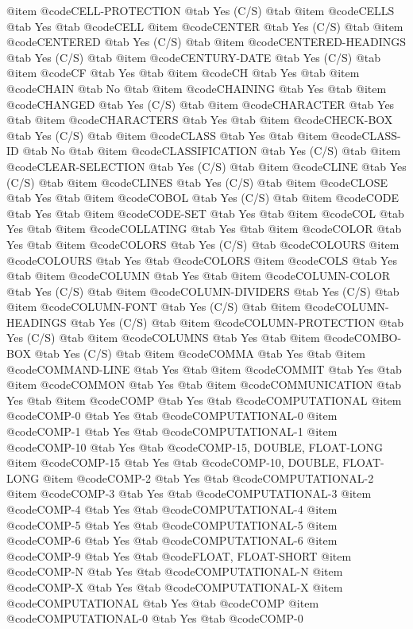 @item @code{CELL-PROTECTION} @tab Yes	(C/S) @tab 
@item @code{CELLS} @tab Yes @tab @code{CELL}
@item @code{CENTER} @tab Yes	(C/S) @tab 
@item @code{CENTERED} @tab Yes	(C/S) @tab 
@item @code{CENTERED-HEADINGS} @tab Yes	(C/S) @tab 
@item @code{CENTURY-DATE} @tab Yes	(C/S) @tab 
@item @code{CF} @tab Yes @tab 
@item @code{CH} @tab Yes @tab 
@item @code{CHAIN} @tab No @tab 
@item @code{CHAINING} @tab Yes @tab 
@item @code{CHANGED} @tab Yes	(C/S) @tab 
@item @code{CHARACTER} @tab Yes @tab 
@item @code{CHARACTERS} @tab Yes @tab 
@item @code{CHECK-BOX} @tab Yes	(C/S) @tab 
@item @code{CLASS} @tab Yes @tab 
@item @code{CLASS-ID} @tab No @tab 
@item @code{CLASSIFICATION} @tab Yes	(C/S) @tab 
@item @code{CLEAR-SELECTION} @tab Yes	(C/S) @tab 
@item @code{CLINE} @tab Yes	(C/S) @tab 
@item @code{CLINES} @tab Yes	(C/S) @tab 
@item @code{CLOSE} @tab Yes @tab 
@item @code{COBOL} @tab Yes	(C/S) @tab 
@item @code{CODE} @tab Yes @tab 
@item @code{CODE-SET} @tab Yes @tab 
@item @code{COL} @tab Yes @tab 
@item @code{COLLATING} @tab Yes @tab 
@item @code{COLOR} @tab Yes @tab 
@item @code{COLORS} @tab Yes	(C/S) @tab @code{COLOURS}
@item @code{COLOURS} @tab Yes @tab @code{COLORS}
@item @code{COLS} @tab Yes @tab 
@item @code{COLUMN} @tab Yes @tab 
@item @code{COLUMN-COLOR} @tab Yes	(C/S) @tab 
@item @code{COLUMN-DIVIDERS} @tab Yes	(C/S) @tab 
@item @code{COLUMN-FONT} @tab Yes	(C/S) @tab 
@item @code{COLUMN-HEADINGS} @tab Yes	(C/S) @tab 
@item @code{COLUMN-PROTECTION} @tab Yes	(C/S) @tab 
@item @code{COLUMNS} @tab Yes @tab 
@item @code{COMBO-BOX} @tab Yes	(C/S) @tab 
@item @code{COMMA} @tab Yes @tab 
@item @code{COMMAND-LINE} @tab Yes @tab 
@item @code{COMMIT} @tab Yes @tab 
@item @code{COMMON} @tab Yes @tab 
@item @code{COMMUNICATION} @tab Yes @tab 
@item @code{COMP} @tab Yes @tab @code{COMPUTATIONAL}
@item @code{COMP-0} @tab Yes @tab @code{COMPUTATIONAL-0}
@item @code{COMP-1} @tab Yes @tab @code{COMPUTATIONAL-1}
@item @code{COMP-10} @tab Yes @tab @code{COMP-15, DOUBLE, FLOAT-LONG}
@item @code{COMP-15} @tab Yes @tab @code{COMP-10, DOUBLE, FLOAT-LONG}
@item @code{COMP-2} @tab Yes @tab @code{COMPUTATIONAL-2}
@item @code{COMP-3} @tab Yes @tab @code{COMPUTATIONAL-3}
@item @code{COMP-4} @tab Yes @tab @code{COMPUTATIONAL-4}
@item @code{COMP-5} @tab Yes @tab @code{COMPUTATIONAL-5}
@item @code{COMP-6} @tab Yes @tab @code{COMPUTATIONAL-6}
@item @code{COMP-9} @tab Yes @tab @code{FLOAT, FLOAT-SHORT}
@item @code{COMP-N} @tab Yes @tab @code{COMPUTATIONAL-N}
@item @code{COMP-X} @tab Yes @tab @code{COMPUTATIONAL-X}
@item @code{COMPUTATIONAL} @tab Yes @tab @code{COMP}
@item @code{COMPUTATIONAL-0} @tab Yes @tab @code{COMP-0}
